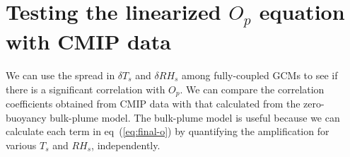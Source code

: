 \documentclass[draft]{agujournal2019}
\begin{document}
\section{Testing the linearized $O_p$ equation with CMIP data}
We can use the spread in $\delta{T_s}$ and $\delta{RH_s}$ among fully-coupled GCMs to see if there is a significant correlation with $O_p$. We can compare the correlation coefficients obtained from CMIP data with that calculated from the zero-buoyancy bulk-plume model. The bulk-plume model is useful because we can calculate each term in eq~(\ref{eq:final-o}) by quantifying the amplification for various $T_s$ and $RH_s$, independently. 





%
%
%
%
%
%
%
%
%
%
\end{document}
